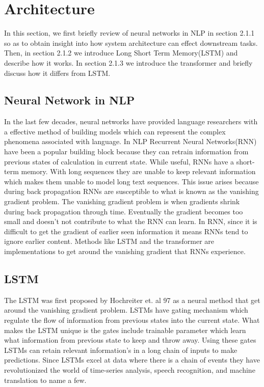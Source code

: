 \section{Architecture}
In this section, we first briefly review of neural networks in NLP in section 2.1.1 so as to obtain insight into how system architecture can effect downstream tasks. Then, in section 2.1.2 we introduce Long Short Term Memory(LSTM) \cite{Hochreiter1997LongSM} and describe how it works. In section 2.1.3 we introduce the transformer \cite{Vaswani2017AttentionIA} and briefly discuss how it differs from LSTM. 
\subsection{Neural Network in NLP}
In the last few decades, neural networks have provided language researchers with a effective method of building models which can represent the complex phenomena associated with language. In NLP Recurrent Neural Networks(RNN) have been a popular building block because they can retrain information from previous states of calculation in current state. While useful, RNNs have a short-term memory. With long sequences they are unable to keep relevant information which makes them unable to model long text sequences. This issue arises because during back propagation RNNs are susceptible to what is known as the vanishing gradient problem. The vanishing gradient problem is when gradients shrink during back propagation through time. Eventually the gradient becomes too small and doesn't not contribute to what the RNN can learn. In RNN, since it is difficult to get the gradient of earlier seen information it means RNNs tend to ignore earlier content. Methods like LSTM and the transformer are implementations to get around the vanishing gradient that RNNs experience. 
\subsection{LSTM}
The LSTM was first proposed by Hochreiter et. al 97 \cite{Hochreiter1997LongSM} as a neural method that get around the vanishing gradient problem. LSTMs have gating mechanism which regulate the flow of information from previous states into the current state. What makes the LSTM unique is the gates include trainable parameter which learn what information from previous state to keep and throw away. Using these gates LSTMs can retain relevant information's in a long chain of inputs to make predictions. Since LSTMs excel at data where there is a chain of events they have revolutionized the world of time-series analysis, speech recognition, and machine translation to name a few. 

